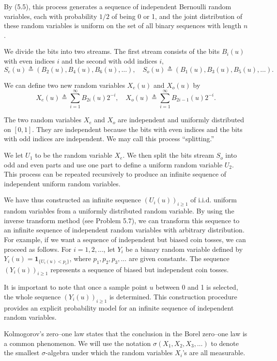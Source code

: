 By (5.5), this process generates a sequence of independent Bernoulli random variables, each with probability $1/2$ of being 0 or 1, and the joint distribution of these random variables is uniform on the set of all binary sequences with length $n$.

\medskip

We divide the bits into two streams. The first stream consists of the bits $B_i(u)$ with even indices $i$ and the second with odd indices $i$,
\[
S_e(u) \triangleq (B_2(u), B_4(u), B_6(u), \dots), \quad S_o(u) \triangleq (B_1(u), B_3(u), B_5(u), \dots).
\]

We can define two new random variables $X_e(u)$ and $X_o(u)$ by
\[
X_e(u) \triangleq \sum_{i=1}^{\infty} B_{2i}(u) 2^{-i}, \quad X_o(u) \triangleq \sum_{i=1}^{\infty} B_{2i-1}(u) 2^{-i}.
\]

The two random variables $X_e$ and $X_o$ are independent and uniformly distributed on $[0,1]$. They are independent because the bits with even indices and the bits with odd indices are independent. We may call this process ``splitting.''

We let $U_1$ to be the random variable $X_e$. We then split the bits stream $S_o$ into odd and even parts and use one part to define a uniform random variable $U_2$. This process can be repeated recursively to produce an infinite sequence of independent uniform random variables.

We have thus constructed an infinite sequence $(U_i(u))_{i\ge 1}$ of i.i.d. uniform random variables from a uniformly distributed random variable. By using the inverse transform method (see Problem 5.7), we can transform this sequence to an infinite sequence of independent random variables with arbitrary distribution. For example, if we want a sequence of independent but biased coin tosses, we can proceed as follows. For $i=1,2,\dots$, let $Y_i$ be a binary random variable defined by $Y_i(u) = \mathbf{1}_{\{U_i(u) < p_i\}}$, where $p_1,p_2,p_3,\dots$ are given constants. The sequence $(Y_i(u))_{i\ge 1}$ represents a sequence of biased but independent coin tosses.

It is important to note that once a sample point $u$ between 0 and 1 is selected, the whole sequence $(Y_i(u))_{i\ge 1}$ is determined. This construction procedure provides an explicit probability model for an infinite sequence of independent random variables.

Kolmogorov's zero--one law states that the conclusion in the Borel zero--one law is a common phenomenon. We will use the notation $\sigma(X_1,X_2,X_3,\dots)$ to denote the smallest $\sigma$-algebra under which the random variables $X_i$'s are all measurable.

